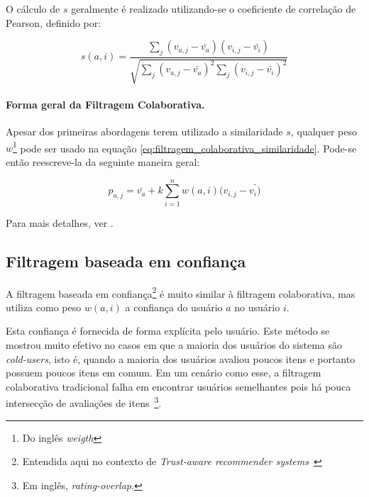 O cálculo de $s$ geralmente é realizado utilizando-se o coeficiente de correlação de Pearson\cite{Breese98}, definido por:

\begin{equation}
\label{eq:calculo_s}
 s(a,i) = \frac{\sum_{j}{(v_{a,j} - \bar{v_{a}}) (v_{i,j} - \bar{v_{i}})}}{\sqrt{\sum_{j}{(v_{a,j} - \bar{v_{a}})}^2\sum_{j}{(v_{i,j} - \bar{v_{i}})}^2}}
\end{equation}

\paragraph{Forma geral da Filtragem Colaborativa.}

Apesar dos primeiras abordagens terem utilizado a similaridade $s$, qualquer peso $w$\footnote{Do inglês \textit{weigth}} pode ser usado na equação \ref{eq:filtragem_colaborativa_similaridade}. Pode-se então reescreve-la da seguinte maneira geral:

\begin{equation}
 p_{a,j} = \bar{v_{a}} + k\sum_{i=1}^n{w(a,i) (v_{i,j} - \bar{v_{i})}}
 \label{eq:filtragem_colaborativa_geral} 
\end{equation}

Para mais detalhes, ver \cite{Breese98}.


\subsection{Filtragem baseada em confiança} %

A filtragem baseada em confiança\footnote{Entendida aqui no contexto de \textit{Trust-aware recommender systems}~\cite{Massa07}} é muito similar à filtragem colaborativa, mas utiliza como peso $w(a,i)$ a confiança do usuário $a$ no usuário $i$.

Esta confiança é fornecida de forma explícita pelo usuário. Este método se mostrou muito efetivo no casos em que a maioria dos usuários do sistema são \textit{cold-users}, isto é, quando a maioria dos usuários avaliou poucos itens e portanto possuem poucos itens em comum. Em um cenário como esse, a filtragem colaborativa tradicional falha em encontrar usuários semelhantes pois há pouca intersecção de avaliações de itens~\footnote{Em inglês, \textit{rating-overlap}.}.



